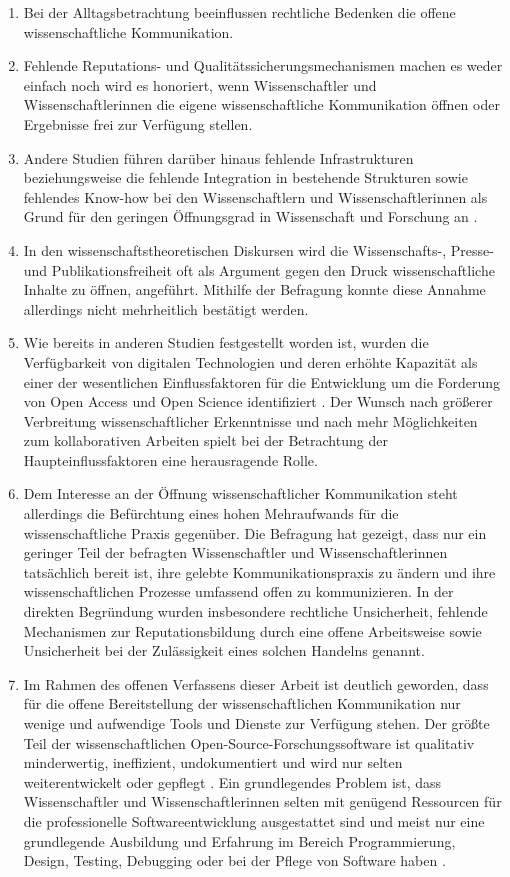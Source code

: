 \begin{enumerate}
\item Bei der Alltagsbetrachtung beeinflussen rechtliche Bedenken die offene wissenschaftliche Kommunikation.
\item Fehlende Reputations- und Qualitätssicherungsmechanismen machen es weder einfach noch wird es honoriert, wenn Wissenschaftler und Wissenschaftlerinnen die eigene wissenschaftliche Kommunikation öffnen oder Ergebnisse frei zur Verfügung stellen.
\item Andere Studien führen darüber hinaus fehlende Infrastrukturen beziehungsweise die fehlende Integration in bestehende Strukturen sowie fehlendes Know-how bei den Wissenschaftlern und Wissenschaftlerinnen als Grund für den geringen Öffnungsgrad in Wissenschaft und Forschung an \cite{eu_open_science_2015}.
\item In den wissenschaftstheoretischen Diskursen wird die Wissenschafts-, Presse- und Publikationsfreiheit oft als Argument gegen den Druck wissenschaftliche Inhalte zu öffnen, angeführt. Mithilfe der Befragung konnte diese Annahme allerdings nicht mehrheitlich bestätigt werden.
\item Wie bereits in anderen Studien festgestellt worden ist, wurden die Verfügbarkeit von digitalen Technologien und deren erhöhte Kapazität als einer der wesentlichen Einflussfaktoren für die Entwicklung um die Forderung von Open Access und Open Science identifiziert \cite{eu_open_science_2015}. Der Wunsch nach größerer Verbreitung wissenschaftlicher Erkenntnisse und nach mehr Möglichkeiten zum kollaborativen Arbeiten spielt bei der Betrachtung der Haupteinflussfaktoren eine herausragende Rolle.
\item Dem Interesse an der Öffnung wissenschaftlicher Kommunikation steht allerdings die Befürchtung eines hohen Mehraufwands für die wissenschaftliche Praxis gegenüber. Die Befragung hat gezeigt, dass nur ein geringer Teil der befragten Wissenschaftler und Wissenschaftlerinnen tatsächlich bereit ist, ihre gelebte Kommunikationspraxis zu ändern und ihre wissenschaftlichen Prozesse umfassend offen zu kommunizieren. In der direkten Begründung wurden insbesondere rechtliche Unsicherheit, fehlende Mechanismen zur Reputationsbildung durch eine offene Arbeitsweise sowie Unsicherheit bei der Zulässigkeit eines solchen Handelns genannt.
\item Im Rahmen des offenen Verfassens dieser Arbeit ist deutlich geworden, dass für die offene Bereitstellung der wissenschaftlichen Kommunikation nur wenige und aufwendige Tools und Dienste zur Verfügung stehen. Der größte Teil der wissenschaftlichen Open-Source-Forschungssoftware ist qualitativ minderwertig, ineffizient, undokumentiert und wird nur selten weiterentwickelt oder gepflegt \cite{hey_2015_open}. Ein grundlegendes Problem ist, dass Wissenschaftler und Wissenschaftlerinnen selten mit genügend Ressourcen für die professionelle Softwareentwicklung ausgestattet sind und meist nur eine grundlegende Ausbildung und Erfahrung im Bereich Programmierung, Design, Testing, Debugging oder bei der Pflege von Software haben \cite{hey_2015_open}.

\end{enumerate}
